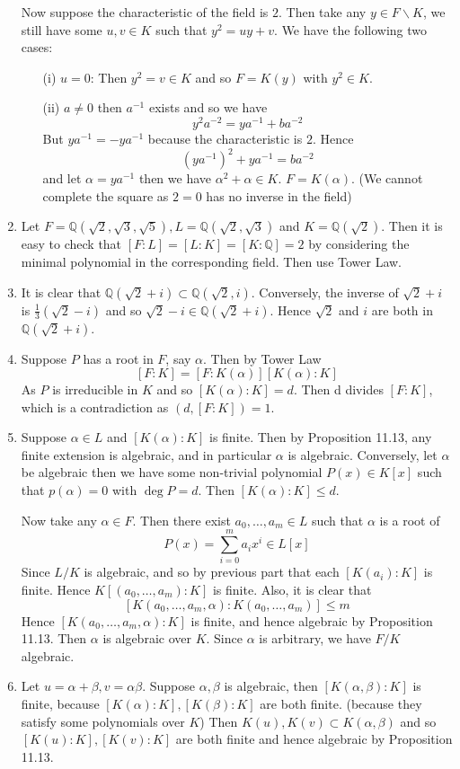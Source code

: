 \begin{enumerate}
     Now suppose the characteristic of the field is $2$. Then take any $y \in F\backslash K$, we still have some
     $u,v \in K$ such that $y^2=uy+v$. We have the following two cases:
     \begin{enumerate}
     \item[(i)] $u=0$: Then $y^2=v \in K$ and so $F=K(y)$ with $y^2 \in K$.\\
     \item[(ii)] $a \neq 0$ then $a^{-1}$ exists and so we have
     $$y^2 a^{-2}=ya^{-1}+ba^{-2}$$ But $ya^{-1}=-ya^{-1}$ because the characteristic is $2$. Hence
     $$(ya^{-1})^2+ya^{-1}=ba^{-2}$$ and let $\alpha=ya^{-1}$ then we have $\alpha^2+\alpha \in K$.
     $F=K(\alpha)$. (We cannot complete the square as $2=0$ has no inverse in the field)
     \end{enumerate}
\item Let $F=\mathbb{Q}(\sqrt{2},\sqrt{3},\sqrt{5}), L=\mathbb{Q}(\sqrt{2},\sqrt{3})$ and $K=\mathbb{Q}(\sqrt{2})$.
     Then it is easy to check that $[F:L]=[L:K]=[K:\mathbb{Q}]=2$ by considering the minimal polynomial in the corresponding field. Then use Tower Law.\\
\item It is clear that $\mathbb{Q}(\sqrt{2}+i) \subset \mathbb{Q}(\sqrt{2},i)$. Conversely, the inverse of $\sqrt{2}+i$ is $\frac{1}{3}(\sqrt{2}-i)$ and so $\sqrt{2}-i \in \mathbb{Q}(\sqrt{2}+i)$. Hence $\sqrt{2}$ and $i$ are both in $\mathbb{Q}(\sqrt{2}+i)$.\\
\item Suppose $P$ has a root in $F$, say $\alpha$. Then by Tower Law
     $$[F:K]=[F:K(\alpha)][K(\alpha):K]$$
     As $P$ is irreducible in $K$ and so $[K(\alpha):K]=d$. Then d divides $[F:K]$, which is a contradiction as
     $(d,[F:K])=1$.\\
\item Suppose $\alpha \in L$ and $[K(\alpha):K]$ is finite. Then by Proposition 11.13, any finite extension is algebraic, and in particular $\alpha$ is algebraic. Conversely, let $\alpha$ be algebraic then we have some non-trivial polynomial $P(x) \in K[x]$ such that $p(\alpha)=0$ with $\deg{P}=d$. Then $[K(\alpha):K] \le d$.

    Now take any $\alpha \in F$. Then there exist $a_0,\ldots,a_m \in L$ such that $\alpha$ is a root of
    $$P(x)=\sum_{i=0}^m a_i x^i \in L[x]$$
    Since $L/K$ is algebraic, and so by previous part that each $[K(a_i):K]$ is finite. Hence
    $K[(a_0,\ldots,a_m):K]$ is finite. Also, it is clear that
    $$[K(a_0,\ldots,a_m,\alpha):K(a_0,\ldots,a_m)] \le m$$
    Hence $[K(a_0,\ldots,a_m,\alpha):K]$ is finite, and hence algebraic by Proposition 11.13. Then $\alpha$ is algebraic over $K$. Since $\alpha$ is arbitrary, we have $F/K$ algebraic.\\
\item Let $u=\alpha+\beta,v=\alpha \beta$. Suppose $\alpha,\beta$ is algebraic, then $[K(\alpha,\beta):K]$ is finite, because $[K(\alpha):K],[K(\beta):K]$ are both finite. (because they satisfy some polynomials over $K$)
    Then $K(u),K(v) \subset K(\alpha,\beta)$ and so $[K(u):K],[K(v):K]$ are both finite and hence algebraic by Proposition 11.13.


\end{enumerate}
